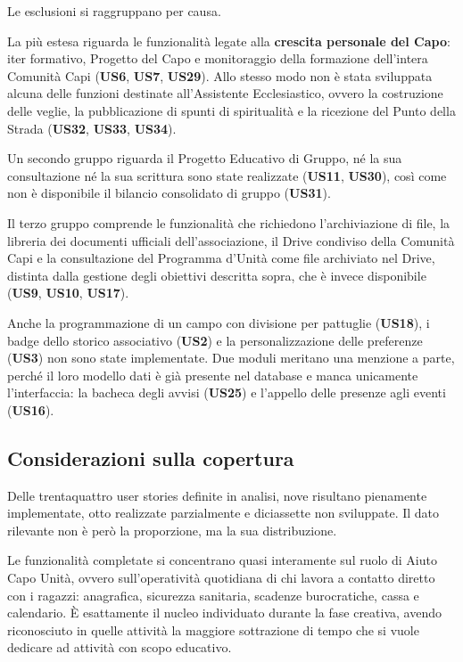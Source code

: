 \documentclass[11pt]{article}
\numberwithin{figure}{section}
\begin{document}
Le esclusioni si raggruppano per causa.

La più estesa riguarda le funzionalità legate alla \textbf{crescita personale del Capo}: iter formativo, Progetto del Capo e monitoraggio della formazione dell'intera Comunità Capi (\textbf{US6}, \textbf{US7}, \textbf{US29}). Allo stesso modo non è stata sviluppata alcuna delle funzioni destinate all'Assistente Ecclesiastico, ovvero la costruzione delle veglie, la pubblicazione di spunti di spiritualità e la ricezione del Punto della Strada (\textbf{US32}, \textbf{US33}, \textbf{US34}).

Un secondo gruppo riguarda il Progetto Educativo di Gruppo, né la sua consultazione né la sua scrittura sono state realizzate (\textbf{US11}, \textbf{US30}), così come non è disponibile il bilancio consolidato di gruppo (\textbf{US31}).

Il terzo gruppo comprende le funzionalità che richiedono l'archiviazione di file, la libreria dei documenti ufficiali dell'associazione, il Drive condiviso della Comunità Capi e la consultazione del Programma d'Unità come file archiviato nel Drive, distinta dalla gestione degli obiettivi descritta sopra, che è invece disponibile (\textbf{US9}, \textbf{US10}, \textbf{US17}).

Anche la programmazione di un campo con divisione per pattuglie (\textbf{US18}), i badge dello storico associativo (\textbf{US2}) e la personalizzazione delle preferenze (\textbf{US3}) non sono state implementate. Due moduli meritano una menzione a parte, perché il loro modello dati è già presente nel database e manca unicamente l'interfaccia: la bacheca degli avvisi (\textbf{US25}) e l'appello delle presenze agli eventi (\textbf{US16}).

\subsection{Considerazioni sulla copertura}

Delle trentaquattro user stories definite in analisi, nove risultano pienamente implementate, otto realizzate parzialmente e diciassette non sviluppate. Il dato rilevante non è però la proporzione, ma la sua distribuzione.

Le funzionalità completate si concentrano quasi interamente sul ruolo di Aiuto Capo Unità, ovvero sull'operatività quotidiana di chi lavora a contatto diretto con i ragazzi: anagrafica, sicurezza sanitaria, scadenze burocratiche, cassa e calendario. È esattamente il nucleo individuato durante la fase creativa, avendo riconosciuto in quelle attività la maggiore sottrazione di tempo che si vuole dedicare ad attività con scopo educativo.
\end{document}

